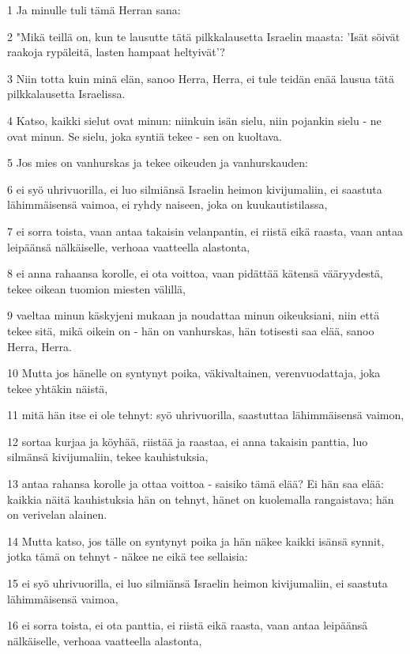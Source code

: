 \par 1 Ja minulle tuli tämä Herran sana:
\par 2 "Mikä teillä on, kun te lausutte tätä pilkkalausetta Israelin maasta: 'Isät söivät raakoja rypäleitä, lasten hampaat heltyivät'?
\par 3 Niin totta kuin minä elän, sanoo Herra, Herra, ei tule teidän enää lausua tätä pilkkalausetta Israelissa.
\par 4 Katso, kaikki sielut ovat minun: niinkuin isän sielu, niin pojankin sielu - ne ovat minun. Se sielu, joka syntiä tekee - sen on kuoltava.
\par 5 Jos mies on vanhurskas ja tekee oikeuden ja vanhurskauden:
\par 6 ei syö uhrivuorilla, ei luo silmiänsä Israelin heimon kivijumaliin, ei saastuta lähimmäisensä vaimoa, ei ryhdy naiseen, joka on kuukautistilassa,
\par 7 ei sorra toista, vaan antaa takaisin velanpantin, ei riistä eikä raasta, vaan antaa leipäänsä nälkäiselle, verhoaa vaatteella alastonta,
\par 8 ei anna rahaansa korolle, ei ota voittoa, vaan pidättää kätensä vääryydestä, tekee oikean tuomion miesten välillä,
\par 9 vaeltaa minun käskyjeni mukaan ja noudattaa minun oikeuksiani, niin että tekee sitä, mikä oikein on - hän on vanhurskas, hän totisesti saa elää, sanoo Herra, Herra.
\par 10 Mutta jos hänelle on syntynyt poika, väkivaltainen, verenvuodattaja, joka tekee yhtäkin näistä,
\par 11 mitä hän itse ei ole tehnyt: syö uhrivuorilla, saastuttaa lähimmäisensä vaimon,
\par 12 sortaa kurjaa ja köyhää, riistää ja raastaa, ei anna takaisin panttia, luo silmänsä kivijumaliin, tekee kauhistuksia,
\par 13 antaa rahansa korolle ja ottaa voittoa - saisiko tämä elää? Ei hän saa elää: kaikkia näitä kauhistuksia hän on tehnyt, hänet on kuolemalla rangaistava; hän on verivelan alainen.
\par 14 Mutta katso, jos tälle on syntynyt poika ja hän näkee kaikki isänsä synnit, jotka tämä on tehnyt - näkee ne eikä tee sellaisia:
\par 15 ei syö uhrivuorilla, ei luo silmiänsä Israelin heimon kivijumaliin, ei saastuta lähimmäisensä vaimoa,
\par 16 ei sorra toista, ei ota panttia, ei riistä eikä raasta, vaan antaa leipäänsä nälkäiselle, verhoaa vaatteella alastonta,

